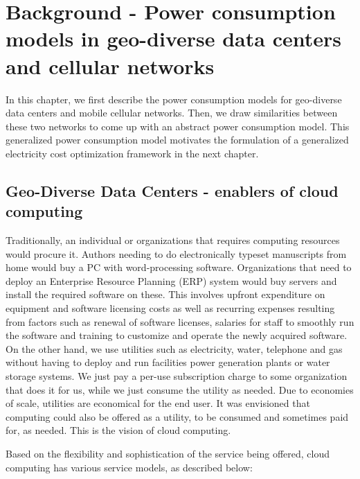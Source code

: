 \chapter{Background - Power consumption models in geo-diverse data centers and cellular networks}
\label{chap:background}
In this chapter, we first describe the power consumption models for geo-diverse data centers and mobile cellular networks. Then, we draw similarities between these two networks to come up with an abstract power consumption model. This generalized power consumption model motivates the formulation of a generalized electricity cost optimization framework in the next chapter. 

\section{Geo-Diverse Data Centers - enablers of cloud computing} Traditionally, an individual or organizations that requires computing resources would procure it. Authors needing to do electronically typeset manuscripts from home would buy a PC with word-processing software. Organizations that need to deploy an Enterprise Resource Planning (ERP) system would buy servers and install the required software on these. This involves upfront expenditure on equipment and software licensing costs as well as recurring expenses resulting from factors such as renewal of software licenses, salaries for staff to smoothly run the software and training to customize and operate the newly acquired software. On the other hand, we use utilities such as electricity, water, telephone and gas without having to deploy and run facilities power generation plants or water storage systems. We just pay a per-use subscription charge to some organization that does it for us, while we just consume the utility as needed. Due to economies of scale, utilities are economical for the end user. It was envisioned that computing could also be offered as a utility, to be consumed and sometimes paid for, as needed. This is the vision of cloud computing.

Based on the flexibility and sophistication of the service being offered, cloud computing has various service models, as described below: 


